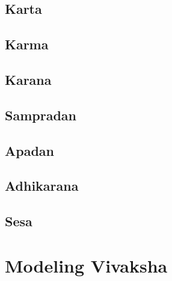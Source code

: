 \documentclass[a4paper,10pt]{article}
\begin{document}
\subsection{Karta}
\subsection{Karma}
\subsection{Karana}
\subsection{Sampradan}
\subsection{Apadan}
\subsection{Adhikarana}
\subsection{Sesa}
\section{Modeling Vivaksha}
\end{document}
